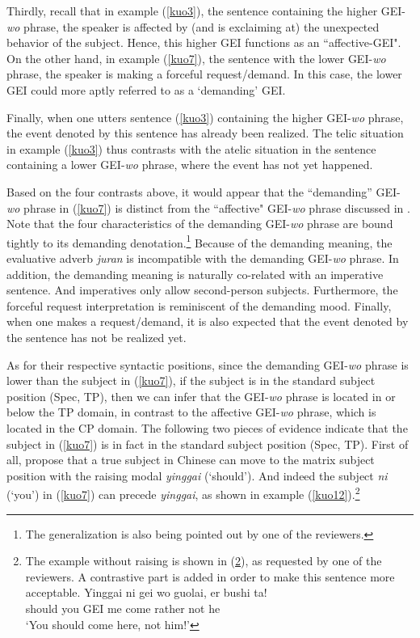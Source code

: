 \documentclass[output=paper,colorlinks,citecolor=brown]{langscibook}
\begin{document}
Thirdly, recall that in example (\ref{kuo3}), the sentence containing the higher GEI-\textit{wo} phrase, the speaker is affected by (and is exclaiming at) the unexpected behavior of the subject. Hence, this higher GEI functions as an “affective-GEI". On the other hand, in example (\ref{kuo7}), the sentence with the lower GEI-\textit{wo} phrase, the speaker is making a forceful request/demand. In this case, the lower GEI could more aptly referred to as a `demanding' GEI.\par
Finally, when one utters sentence (\ref{kuo3}) containing the higher GEI-\textit{wo} phrase, the event denoted by this sentence has already been realized. The telic situation in example (\ref{kuo3}) thus contrasts with the atelic situation in the sentence containing a lower GEI-\textit{wo} phrase, where the event has not yet happened.\par
Based on the four contrasts above, it would appear that the ``demanding'' GEI-\textit{wo} phrase in (\ref{kuo7}) is distinct from the “affective" GEI-\textit{wo} phrase discussed in \citet{Tsai2017}. Note that the four characteristics of the demanding GEI-\textit{wo} phrase are bound tightly to its demanding denotation.\footnote{The generalization is also being pointed out by one of the reviewers.} Because of the demanding meaning, the evaluative adverb \textit{juran} is incompatible with the demanding GEI-\textit{wo} phrase. In addition, the demanding meaning is naturally co-related with an imperative sentence. And imperatives only allow second-person subjects. Furthermore, the forceful request interpretation is reminiscent of the demanding mood. Finally, when one makes a request/demand, it is also expected that the event denoted by the sentence has not be realized yet.\par
As for their respective syntactic positions, since the demanding GEI-\textit{wo} phrase is lower than the subject in (\ref{kuo7}), if the subject is in the standard subject position (Spec, TP), then we can infer that the GEI-\textit{wo} phrase is located in or below the TP domain, in contrast to the affective GEI-\textit{wo} phrase, which is located in the CP domain. The following two pieces of evidence indicate that the subject in (\ref{kuo7}) is in fact in the standard subject position (Spec, TP). First of all, \citet{Lin&Tang1995} propose that a true subject in Chinese can move to the matrix subject position with the raising modal \textit{yinggai} (`should'). And indeed the subject \textit{ni} (`you') in (\ref{kuo7}) can precede \textit{yinggai}, as shown in example (\ref{kuo12}).\footnote{The example without raising is shown in (\ref{kuoi}), as requested by one of the reviewers. A contrastive part is added in order to make this sentence more acceptable. 
\ea
\label{kuoi}
\gll    Yinggai	ni 	gei wo 	guolai, 	er 		bushi 	ta! \\ 
        should	you	GEI	me	come	rather	not		he\\
\glt    `You should come here, not him!'
\z
}
\end{document}

